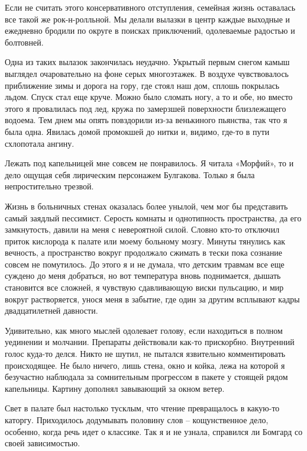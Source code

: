 \documentclass[
]{book}
\begin{document}
Если не считать этого консервативного отступления, семейная жизнь оставалась все такой же рок-н-ролльной. Мы делали вылазки в центр каждые выходные и ежедневно бродили по округе в поисках приключений, одолеваемые радостью и болтовней.

Одна из таких вылазок закончилась неудачно. Укрытый первым снегом камыш выглядел очаровательно на фоне серых многоэтажек. В воздухе чувствовалось приближение зимы и дорога на гору, где стоял наш дом, сплошь покрылась льдом. Спуск стал еще круче. Можно было сломать ногу, а то и обе, но вместо этого я провалилась под лед, кружа по замерзшей поверхности близлежащего водоема. Тем днем мы опять повздорили из-за венькиного пьянства, так что я была одна. Явилась домой промокшей до нитки и, видимо, где-то в пути схлопотала ангину.

Лежать под капельницей мне совсем не понравилось. Я читала «Морфий», то и дело ощущая себя лирическим персонажем Булгакова. Только я была непростительно трезвой.

Жизнь в больничных стенах оказалась более унылой, чем мог бы представить самый заядлый пессимист. Серость комнаты и однотипность пространства, да его замкнутость, давили на меня с невероятной силой. Словно кто-то отключил приток кислорода к палате или моему больному мозгу. Минуты тянулись как вечность, а пространство вокруг продолжало сжимать в тески пока сознание совсем не помутилось. До этого я и не думала, что детским травмам все еще суждено до меня добраться, но вот температура вновь поднимается, дышать становится все сложней, я чувствую сдавливающую виски пульсацию, и мир вокруг растворяется, унося меня в забытие, где один за другим всплывают кадры двадцатилетней давности.

Удивительно, как много мыслей одолевает голову, если находиться в полном уединении и молчании. Препараты действовали как-то прискорбно. Внутренний голос куда-то делся. Никто не шутил, не пытался язвительно комментировать происходящее. Не было ничего, лишь стена, окно и койка, лежа на которой я безучастно наблюдала за сомнительным прогрессом в пакете у стоящей рядом капельницы. Картину дополнял завывающий за окном ветер.

Свет в палате был настолько тусклым, что чтение превращалось в какую-то каторгу. Приходилось додумывать половину слов -- кощунственное дело, особенно, когда речь идет о классике. Так я и не узнала, справился ли Бомгард со своей зависимостью.
\end{document}
